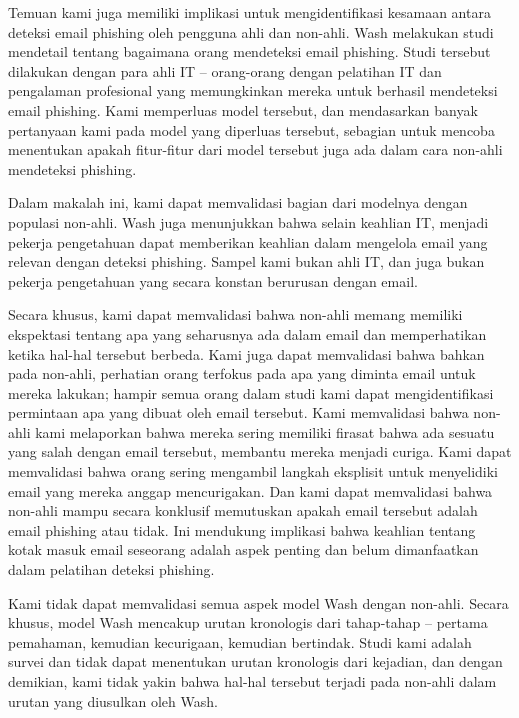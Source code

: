 \documentclass[lettersize,journal]{IEEEtran}
\begin{document}
Temuan kami juga memiliki implikasi untuk mengidentifikasi kesamaan antara
deteksi email phishing oleh pengguna ahli dan non-ahli. Wash \cite{tigaempat}
melakukan studi mendetail tentang bagaimana orang mendeteksi email phishing.
Studi tersebut dilakukan dengan para ahli IT – orang-orang dengan pelatihan IT
dan pengalaman profesional yang memungkinkan mereka untuk berhasil mendeteksi
email phishing. Kami memperluas model tersebut, dan mendasarkan banyak
pertanyaan kami pada model yang diperluas tersebut, sebagian untuk mencoba
menentukan apakah fitur-fitur dari model tersebut juga ada dalam cara non-ahli
mendeteksi phishing.

Dalam makalah ini, kami dapat memvalidasi bagian dari modelnya dengan populasi
non-ahli. Wash juga menunjukkan bahwa selain keahlian IT, menjadi pekerja
pengetahuan dapat memberikan keahlian dalam mengelola email yang relevan dengan
deteksi phishing. Sampel kami bukan ahli IT, dan juga bukan pekerja pengetahuan
yang secara konstan berurusan dengan email.

Secara khusus, kami dapat memvalidasi bahwa non-ahli memang memiliki ekspektasi
tentang apa yang seharusnya ada dalam email dan memperhatikan ketika hal-hal
tersebut berbeda. Kami juga dapat memvalidasi bahwa bahkan pada non-ahli,
perhatian orang terfokus pada apa yang diminta email untuk mereka lakukan;
hampir semua orang dalam studi kami dapat mengidentifikasi permintaan apa yang
dibuat oleh email tersebut. Kami memvalidasi bahwa non-ahli kami melaporkan
bahwa mereka sering memiliki firasat bahwa ada sesuatu yang salah dengan email
tersebut, membantu mereka menjadi curiga. Kami dapat memvalidasi bahwa orang
sering mengambil langkah eksplisit untuk menyelidiki email yang mereka anggap
mencurigakan. Dan kami dapat memvalidasi bahwa non-ahli mampu secara konklusif
memutuskan apakah email tersebut adalah email phishing atau tidak. Ini
mendukung implikasi bahwa keahlian tentang kotak masuk email seseorang adalah
aspek penting dan belum dimanfaatkan dalam pelatihan deteksi phishing.

Kami tidak dapat memvalidasi semua aspek model Wash dengan non-ahli. Secara
khusus, model Wash mencakup urutan kronologis dari tahap-tahap – pertama
pemahaman, kemudian kecurigaan, kemudian bertindak. Studi kami adalah survei
dan tidak dapat menentukan urutan kronologis dari kejadian, dan dengan
demikian, kami tidak yakin bahwa hal-hal tersebut terjadi pada non-ahli dalam
urutan yang diusulkan oleh Wash.
\end{document}
